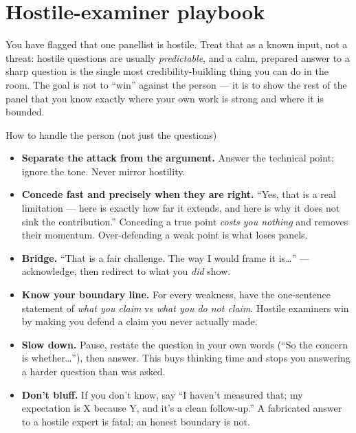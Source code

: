 \documentclass[11pt]{article}
\begin{document}
\section{Hostile-examiner playbook}
\label{sec:hostile}

You have flagged that one panellist is hostile. Treat that as a known input,
not a threat: hostile questions are usually \emph{predictable}, and a calm,
prepared answer to a sharp question is the single most credibility-building
thing you can do in the room. The goal is not to ``win'' against the person ---
it is to show the rest of the panel that you know exactly where your own work
is strong and where it is bounded.

\begin{okboxx}{How to handle the person (not just the questions)}
\begin{itemize}[leftmargin=1.2em,itemsep=0.1em]
  \item \textbf{Separate the attack from the argument.} Answer the technical
        point; ignore the tone. Never mirror hostility.
  \item \textbf{Concede fast and precisely when they are right.} ``Yes, that is
        a real limitation --- here is exactly how far it extends, and here is
        why it does not sink the contribution.'' Conceding a true point
        \emph{costs you nothing} and removes their momentum. Over-defending a
        weak point is what loses panels.
  \item \textbf{Bridge.} ``That is a fair challenge. The way I would frame it
        is\dots'' --- acknowledge, then redirect to what you \emph{did} show.
  \item \textbf{Know your boundary line.} For every weakness, have the
        one-sentence statement of \emph{what you claim} vs \emph{what you do
        not claim}. Hostile examiners win by making you defend a claim you
        never actually made.
  \item \textbf{Slow down.} Pause, restate the question in your own words
        (``So the concern is whether\dots''), then answer. This buys thinking
        time and stops you answering a harder question than was asked.
  \item \textbf{Don't bluff.} If you don't know, say ``I haven't measured that;
        my expectation is X because Y, and it's a clean follow-up.'' A
        fabricated answer to a hostile expert is fatal; an honest boundary is
        not.
\end{itemize}
\end{okboxx}
\end{document}
